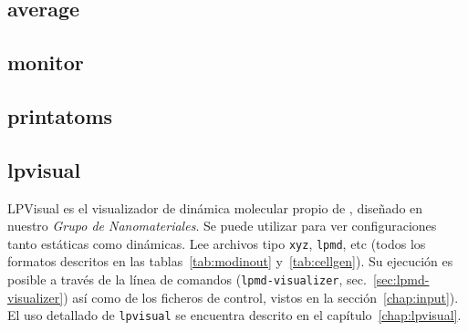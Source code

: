 \subsection {average}

\subsection {monitor}

\subsection {printatoms}

\subsection{lpvisual}

LPVisual es el visualizador de din\'amica molecular propio de {\lpmd}, dise\~nado en nuestro \emph{Grupo de Nanomateriales}. Se puede utilizar para ver configuraciones tanto est\'aticas como din\'amicas. Lee archivos tipo {\tt xyz}, {\tt lpmd}, etc (todos los formatos descritos en las tablas~\ref{tab:modinout} y~\ref{tab:cellgen}). Su ejecuci\'on es posible a trav\'es de la l\'inea de comandos ({\tt lpmd-visualizer}, sec.~\ref{sec:lpmd-visualizer}) as\'i como de los ficheros de control, vistos en la secci\'on~\ref{chap:input}). El uso detallado de {\tt lpvisual} se encuentra descrito en el cap\'itulo~\ref{chap:lpvisual}.


